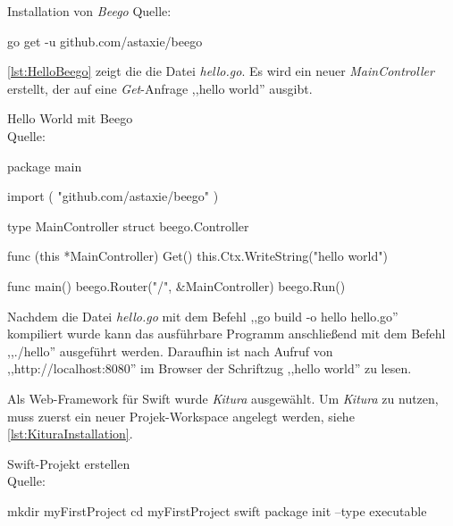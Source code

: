 \begin{listing}[H]
\caption{Installation von \textit{Beego} Quelle:\cite{Beego}}
\label{lst:BeegoInstallation}
\begin{Commandline}
go get -u github.com/astaxie/beego
\end{Commandline}
\end{listing}

\autoref{lst:HelloBeego} zeigt die die Datei \textit{hello.go}. 
Es wird ein neuer \textit{MainController} erstellt, der auf eine \textit{Get}-Anfrage ,,hello world'' ausgibt.

\begin{listing}[H]
\caption{Hello World mit Beego \\ Quelle:\cite{Beego}}
\label{lst:HelloBeego}
\begin{GoCode}
package main

import (
    "github.com/astaxie/beego"
)

type MainController struct {
    beego.Controller
}

func (this *MainController) Get() {
    this.Ctx.WriteString("hello world")
}

func main() {
    beego.Router("/", &MainController{})
    beego.Run()
}
\end{GoCode}
\end{listing}

Nachdem die Datei \textit{hello.go} mit dem Befehl ,,go build -o hello hello.go'' kompiliert wurde kann das ausführbare Programm anschließend mit dem Befehl ,,./hello'' ausgeführt werden. Daraufhin ist nach Aufruf von ,,http://localhost:8080'' im Browser der Schriftzug ,,hello world'' zu lesen.



Als Web-Framework für Swift wurde \textit{Kitura} ausgewählt.
Um \textit{Kitura} zu nutzen, muss zuerst ein neuer Projek-Workspace angelegt werden, siehe \autoref{lst:KituraInstallation}.

\begin{listing}[H]
\caption{Swift-Projekt erstellen \\ Quelle:\cite{Kitura}}
\label{lst:KituraInstallation}
\begin{Commandline}
mkdir myFirstProject
cd myFirstProject
swift package init --type executable
\end{Commandline}
\end{listing}

